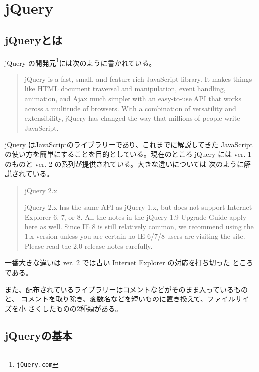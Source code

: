 \chapter{jQuery}
\section{jQueryとは}
jQuery の開発元\footnote{\texttt{jQuery.com}}には次のように書かれている。
\begin{quotation}
jQuery is a fast, small, and feature-rich JavaScript library. It makes
 things like HTML document traversal and manipulation, event handling,
 animation, and Ajax much simpler with an easy-to-use API that works
 across a multitude of browsers. With a combination of versatility and
 extensibility, jQuery has changed the way that millions of people write
 JavaScript.
\end{quotation}
jQuery はJavaScriptのライブラリーであり、これまでに解説してきた
JavaScriptの使い方を簡単にすることを目的としている。現在のところ jQuery
には ver. 1 のものと ver. 2 の系列が提供されている。大きな違いについては
次のように解説されている。
\iffalse
Query 1.x

The jQuery 1.x line had major changes as of jQuery 1.9.0. We strongly
recommend that you also use the jQuery Migrate plugin if you are
upgrading from pre-1.9 versions of jQuery or need to use plugins that
haven't yet been updated. Read the jQuery 1.9 Upgrade Guide and the
jQuery 1.9 　
\fi
\begin{quotation}
jQuery 2.x

jQuery 2.x has the same API as jQuery 1.x, but does not support Internet
Explorer 6, 7, or 8. All the notes in the jQuery 1.9 Upgrade Guide apply
here as well. Since IE 8 is still relatively common, we recommend using
the 1.x version unless you are certain no IE 6/7/8 users are visiting
the site. Please read the 2.0 release notes carefully. 
\end{quotation}
一番大きな違いは ver. 2 では古い Internet Explorer の対応を打ち切った
ところである。

また、配布されているライブラリーはコメントなどがそのまま入っているものと、
コメントを取り除き、変数名などを短いものに置き換えて、ファイルサイズを小
さくしたものの2種類がある。
\newcommand{\FuncRef}[1]{%
\refstepcounter{Func}\label{#1}({\bfseries 機能\arabic{Func}})}
\section{jQueryの基本}
